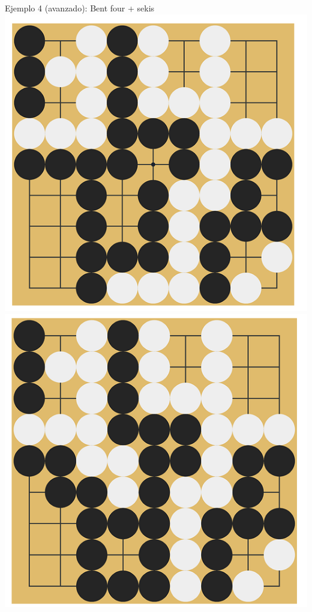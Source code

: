 \documentclass{beamer}
\begin{document}
\begin{frame}{Ejemplo 4 (avanzado): Bent four + sekis}
        \includegraphics[scale=0.3]{tsumego1.png}
        \includegraphics[scale=0.3]{tsumego2.png}
\end{frame}
\end{document}
